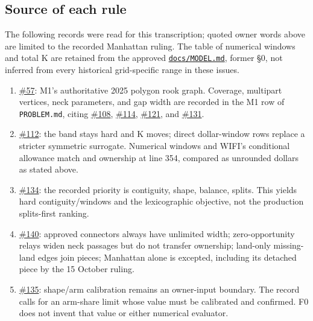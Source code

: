 \documentclass[11pt,letterpaper]{article}
\newcommand{\issue}[1]{\href{https://github.com/helios1168/td/issues/#1}{\##1}}
\newcommand{\MODEL}{\href{MODEL.md}{\texttt{docs/MODEL.md}}}
\begin{document}
\subsection*{Source of each rule}
The following records were read for this transcription; quoted owner words
above are limited to the recorded Manhattan ruling. The table of numerical
windows and total K are retained from the approved \MODEL, former \S0,
not inferred from every historical grid-specific range in these issues.
\begin{enumerate}
\item \issue{57}: M1's authoritative 2025 polygon rook graph. Coverage,
multipart vertices, neck parameters, and gap width are recorded in the
M1 row of \texttt{PROBLEM.md}, citing \issue{108}, \issue{114},
\issue{121}, and \issue{131}.
\item \issue{112}: the band stays hard and K moves; direct dollar-window
rows replace a stricter symmetric surrogate. Numerical windows and
WIFI's conditional allowance match 
and ownership at line 354, compared as unrounded dollars as stated above.
\item \issue{134}: the recorded priority is contiguity, shape, balance,
splits. This yields hard contiguity/windows and the lexicographic
objective, not the production splits-first ranking.
\item \issue{140}: approved connectors always have unlimited width;
zero-opportunity relays widen neck passages but do not transfer ownership;
land-only missing-land edges join pieces; Manhattan alone is excepted,
including its detached piece by the 15 October ruling.
\item \issue{135}: shape/arm calibration remains an owner-input boundary.
The record calls for an arm-share limit whose value must be calibrated
and confirmed. F0 does not invent that value or either numerical evaluator.
\end{enumerate}
\end{document}
